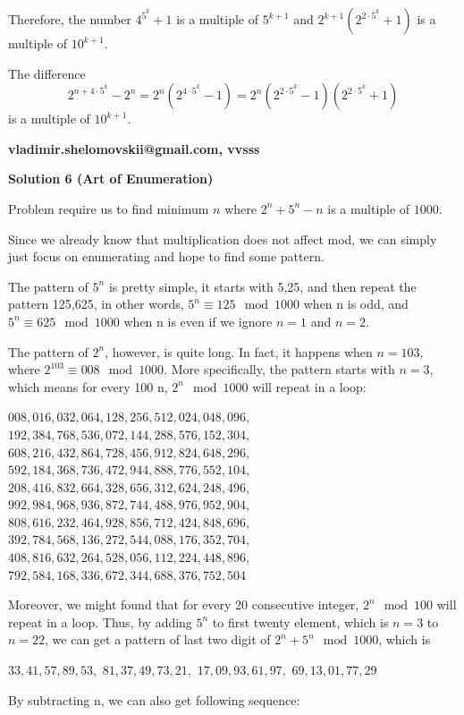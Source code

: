 \begin{enumerate}
 Therefore, the number $4^{5^k}+1$ is  a multiple of $5^{k+1}$ and  $2^{k+1} (2^{2\cdot 5^k}+1)$ is  a multiple of $10^{k+1}$.

 The difference 
 \[2^{n+4\cdot 5^k}-2^n=2^n(2^{4\cdot 5^k}-1) = 2^n(2^{2\cdot 5^k}-1)(2^{2\cdot 5^k}+1)\] is a multiple of $10^{k+1}.$

 \textbf{vladimir.shelomovskii@gmail.com, vvsss}

 



\textbf{Solution 6 (Art of Enumeration)}

Problem require us to find minimum $n$ where $2^n + 5^n - n$ is a multiple of $1000$.

 Since we already know that multiplication does not affect mod, we can simply just focus on enumerating and hope to find some pattern.

 The pattern of $5^n$ is pretty simple, it starts with 5,25, and then repeat the pattern 125,625, in other words, $5^n\equiv 125 \mod{1000}$ when n is odd, and $5^n\equiv 625 \mod{1000}$ when n is even if we ignore $n=1$ and $n=2$.

 The pattern of $2^n$, however, is quite long. In fact, it happens when $n=103$, where $2^{103} \equiv 008 \mod{1000}$. More specifically, the pattern starts with $n=3$, which means for every 100 n, $2^n \mod 1000$ will repeat in a loop: 

 $008{,}016{,}032{,}064{,}128{,}256{,}512{,}024{,}048{,}096{,}$$192{,}384{,}768{,}536{,}072{,}144{,}288{,}576{,}152{,}304{,}$$608{,}216{,}432{,}864{,}728{,}456{,}912{,}824{,}648{,}296{,}$$592{,}184{,}368{,}736{,}472{,}944{,}888{,}776{,}552{,}104{,}$$208{,}416{,}832{,}664{,}328{,}656{,}312{,}624{,}248{,}496{,}$$992{,}984{,}968{,}936{,}872{,}744{,}488{,}976{,}952{,}904{,}$$808{,}616{,}232{,}464{,}928{,}856{,}712{,}424{,}848{,}696{,}$$392{,}784{,}568{,}136{,}272{,}544{,}088{,}176{,}352{,}704{,}$$408{,}816{,}632{,}264{,}528{,}056{,}112{,}224{,}448{,}896{,}$$792{,}584{,}168{,}336{,}672{,}344{,}688{,}376{,}752{,}504$

 Moreover, we might found that for every 20 consecutive integer, $2^n \mod 100$ will repeat in a loop. Thus, by adding $5^n$ to first twenty element, which is $n=3$ to $n=22$, we can get a pattern of last two digit of $2^n + 5^n \mod{1000}$, which is 

 $33{,}41{,}57{,}89{,}53{,}$
$81{,}37{,}49{,}73{,}21{,}$
$17{,}09{,}93{,}61{,}97{,}$
$69{,}13{,}01{,}77{,}29$

 By subtracting n, we can also get following sequence:


\end{enumerate}
